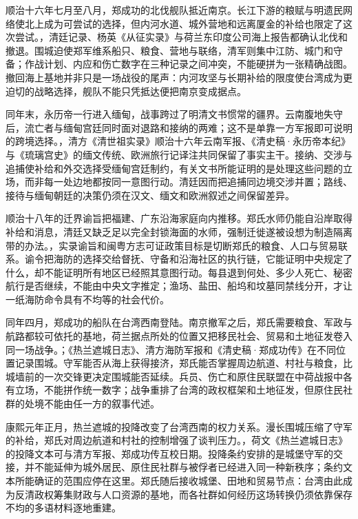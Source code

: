 顺治十六年七月至八月，郑成功的北伐舰队抵近南京。长江下游的粮赋与明遗民网络使北上成为可尝试的选择，但内河水道、城外营地和远离厦金的补给也限定了这次尝试。，清廷记录、杨英《从征实录》与荷兰东印度公司海上报告都确认北伐和撤退。围城迫使郑军维系船只、粮食、营地与联络，清军则集中江防、城门和守备；作战计划、内应和伤亡数字在三种记录之间冲突，不能硬拼为一张精确战图。撤回海上基地并非只是一场战役的尾声：内河攻坚与长期补给的限度使台湾成为更迫切的战略选择，舰队不能只凭抵达便把南京变成据点。

同年末，永历帝一行进入缅甸，战事跨过了明清文书惯常的疆界。云南腹地失守后，流亡者与缅甸宫廷同时面对退路和接纳的两难；这不是单靠一方军报即可说明的跨境选择。，清方《清世祖实录》顺治十六年云南军报、《清史稿·永历帝本纪》与《琉璃宫史》的缅文传统、欧洲旅行记译注共同保留了事实主干。接纳、交涉与追捕使补给和外交选择受缅甸宫廷制约，有关文书所能证明的是处理这些问题的立场，而非每一处边地都按同一意图行动。清廷因而把追捕同边境交涉并置；路线、接待与缅甸朝廷的决策仍须在汉文、缅文和欧洲叙述之间保留差异。

顺治十八年的迁界谕旨把福建、广东沿海家庭向内推移。郑氏水师仍能自沿岸取得补给和消息，清廷又缺乏足以完全封锁海面的水师，强制迁徙遂被设想为制造隔离带的办法。，实录谕旨和闽粤方志可证政策目标是切断郑氏的粮食、人口与贸易联系。谕令把海防的选择交给督抚、守备和沿海社区的执行链，它能证明中央规定了什么，却不能证明所有地区已经照其意图行动。每县退到何处、多少人死亡、秘密航行是否继续，不能由中央文字推定；渔场、盐田、船坞和坟墓同禁线分开，才让一纸海防命令具有不均等的社会代价。

同年四月，郑成功的船队在台湾西南登陆。南京撤军之后，郑氏需要粮食、军政与航路都较可依托的基地，荷兰据点所处的位置又把移民社会、贸易和土地征发卷入同一场战争。；《热兰遮城日志》、清方海防军报和《清史稿·郑成功传》在不同位置记录围城。守军能否从海上获得接济，郑氏能否掌握周边航道、村社与粮食，比城墙前的一次交锋更决定围城能否延续。兵员、伤亡和原住民联盟在中荷战报中各有立场，不能拼作统一数字；战争重排了台湾的政权框架和土地征发，但原住民社群的处境不能由任一方的叙事代述。

康熙元年正月，热兰遮城的投降改变了台湾西南的权力关系。漫长围城压缩了守军的补给，郑氏对周边航道和村社的控制增强了谈判压力。，荷文《热兰遮城日志》的投降文本可与清方军报、郑成功传互校日期。投降条约安排的是城堡守军的交接，并不能延伸为城外居民、原住民社群与被俘者已经进入同一种新秩序；条约文本所能确证的范围应停在这里。郑氏随后接收城堡、田地和贸易节点：台湾由此成为反清政权筹集财政与人口资源的基地，而各社群如何经历这场转换仍须依靠保存不均的多语材料逐地重建。

